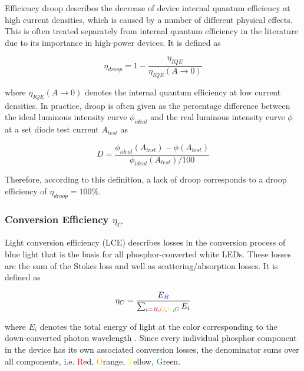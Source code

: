 \documentclass[twoside,twocolumn,9pt]{article}
\begin{document}
Efficiency droop describes the decrease of device internal quantum efficiency at high current densities, which is caused by a number of different physical effects\cite{David2020}. This is often treated separately from internal quantum efficiency in the literature due to its importance in high-power devices. It is defined as

\begin{equation}
    \eta_{droop} = 1 - \frac{\eta_{IQE}}{\eta_{IQE}(A \rightarrow 0)}
\end{equation}

where $\eta_{IQE}(A \rightarrow 0)$ denotes the internal quantum efficiency at low current densities. In practice, droop is often given as the percentage difference between the ideal luminous intensity curve $\phi_{ideal}$ and the real luminous intensity curve $\phi$ at a set diode test current $A_{test}$ as

\begin{equation}
\label{eqn:droop}
    D = \frac{\phi_{ideal}(A_{test})-\phi(A_{test})}{\phi_{ideal}(A_{test})/100}
\end{equation}

Therefore, according to this definition, a lack of droop corresponds to a droop efficiency of $\eta_{droop} = 100\%$\cite{schubert2018light}\cite{tsao2010solid}.

\subsubsection{Conversion Efficiency $\eta_{C}$}

Light conversion efficiency (LCE) describes losses in the conversion process of blue light that is the basis for all phosphor-converted white LEDs. These losses are the sum of the Stokes loss and well as scattering/absorption losses. It is defined as

\begin{equation}
    \eta_{C} = \frac{E_{\textcolor{blue}{B}}}{\sum_{i=\textcolor{red}{R},\textcolor{orange}{O},\textcolor{yellow}{Y},\textcolor{teal}{G}} E_i}
\end{equation}

where $E_i$ denotes the total energy of light at the color corresponding to the down-converted photon wavelength \cite{schubert2018light}\cite{tsao2010solid}. Since every individual phosphor component in the device has its own associated conversion losses, the denominator sums over all components, i.e. \textcolor{red}{R}ed, \textcolor{orange}{O}range, \textcolor{yellow}{Y}ellow, \textcolor{teal}{G}reen.
\end{document}
